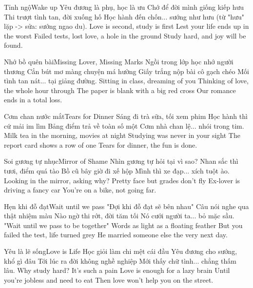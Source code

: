 \begin{tutuyetbox}{Tỉnh ngộ}{Wake up}
Yêu đương là phụ, học là ưu
Chớ để đời mình giống kiếp hưu
Thi trượt tình tan, đời xuống hố
Học hành đến chốn... sướng như hưu (từ "hưu" lặp -> sửa: sướng ngao du).
\tcblower
Love is second, study is first
Lest your life ends up in the worst
Failed tests, lost love, a hole in the ground
Study hard, and joy will be found.
\end{tutuyetbox}

\begin{tutuyetbox}{Nhớ bồ quên bài}{Missing Lover, Missing Marks}
Ngồi trong lớp học nhớ người thương
Cắn bút mơ màng chuyện má hường
Giấy trắng nộp bài cô gạch chéo
Mối tình tan nát... tại giảng đường.
\tcblower
Sitting in class, dreaming of you
Thinking of love, the whole hour through
The paper is blank with a big red cross
Our romance ends in a total loss.
\end{tutuyetbox}

\begin{tutuyetbox}{Cơm chan nước mắt}{Tears for Dinner}
Sáng đi trà sữa, tối xem phim
Học hành thì cứ mải im lìm
Bảng điểm trả về toàn số một
Cơm nhà chan lệ... nhói trong tim.
\tcblower
Milk tea in the morning, movies at night
Studying was never in your sight
The report card shows a row of one
Tears for dinner, the fun is done.
\end{tutuyetbox}

\begin{tutuyetbox}{Soi gương tự nhục}{Mirror of Shame}
Nhìn gương tự hỏi tại vì sao?
Nhan sắc thì tươi, điểm quá tào
Bồ cũ bây giờ đi xế hộp
Mình thì xe đạp... xích tuột ào.
\tcblower
Looking in the mirror, asking why?
Pretty face but grades don't fly
Ex-lover is driving a fancy car
You're on a bike, not going far.
\end{tutuyetbox}

\begin{tutuyetbox}{Hẹn khi đỗ đạt}{Wait until we pass}
"Đợi khi đỗ đạt sẽ bên nhau"
Câu nói nghe qua thật nhiệm màu
Nào ngờ thi rớt, đời tăm tối
Nó cưới người ta... bỏ mặc sầu.
\tcblower
"Wait until we pass to be together"
Words as light as a floating feather
But you failed the test, life turned grey
He married someone else the very next day.
\end{tutuyetbox}

\begin{tutuyetbox}{Yêu là lẽ sống}{Love is Life}
Học giỏi làm chi mệt cái đầu
Yêu đương cho sướng, khổ gì đâu
Tới lúc ra đời không nghề nghiệp
Mới thấy chữ tình... chẳng thấm lâu.
\tcblower
Why study hard? It's such a pain
Love is enough for a lazy brain
Until you're jobless and need to eat
Then love won't help you on the street.
\end{tutuyetbox}

